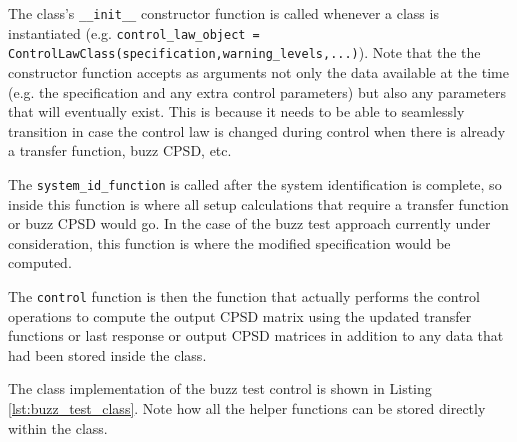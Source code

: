 \documentclass[pdf,12pt,report]{SANDreport}
\newcommand{\inlineCode}{\lstinline[basicstyle=\bfseries\ttfamily]}
\begin{document}
    The class's \inlineCode{__init__} constructor function is called whenever a class is instantiated (e.g. \inlineCode{control_law_object = ControlLawClass(specification,warning_levels,...)}).  Note that the the constructor function accepts as arguments not only the data available at the time (e.g. the specification and any extra control parameters) but also any parameters that will eventually exist.  This is because it needs to be able to seamlessly transition in case the control law is changed during control when there is already a transfer function, buzz \ac{CPSD}, etc.
    
    The \inlineCode{system_id_function} is called after the system identification is complete, so inside this function is where all setup calculations that require a transfer function or buzz \ac{CPSD} would go.  In the case of the buzz test approach currently under consideration, this function is where the modified specification would be computed.
    
    The \inlineCode{control} function is then the function that actually performs the control operations to compute the output \ac{CPSD} matrix using the updated transfer functions or last response or output \ac{CPSD} matrices in addition to any data that had been stored inside the class.
    
    The class implementation of the buzz test control is shown in Listing \ref{lst:buzz_test_class}.  Note how all the helper functions can be stored directly within the class.
    
\end{document}
